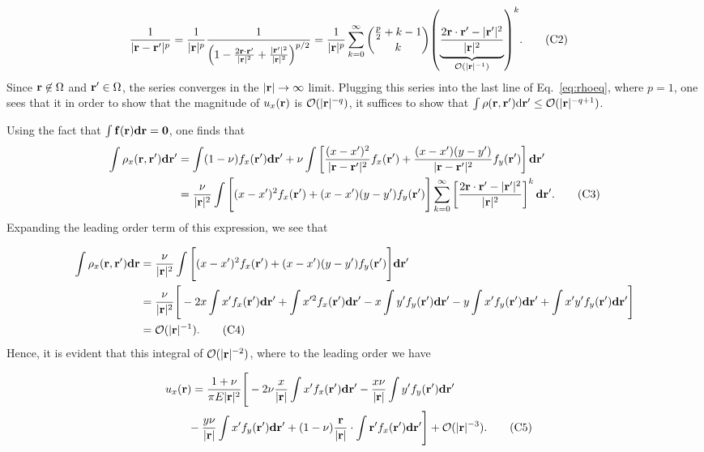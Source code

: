 \documentclass[aps,prl,reprint,groupedaddress,twocolumn]{revtex4-1}
\def\d{{\bf d}}
\def\dd{\mbox{d}}
\def\f{{\bf f}}
\def\r{{\bf r}}
\begin{document}
\begin{appendix}
\begin{align}
\frac{1}{|\r-\r'|^p} &= \frac{1}{|\r|^p}\frac{1}{\left(1 - \frac{2\r\cdot\r'}{|\r|^2} 
+\frac{\vert\r'\vert^{2}}{\vert\r\vert^{2}}\right)^{p/2}} = 
\frac{1}{|\r|^p}\sum_{k=0}^\infty {{{p\over 2}+k-1}\choose{k}} 
{\left( \underbrace{ \frac{2\r\cdot\r' - |\r'|^2}{|\r|^2}}_{\mathcal{O}(|\r|^{-1})} \right)}^k.
\tag{C2}
\end{align}
% 
Since $\r\not\in\Omega$ and $\r'\in\Omega$, the series converges in
the $\vert \r\vert \to \infty$ limit. Plugging this series into the
last line of Eq.~\ref{eq:rhoeq}, where $p=1$, one sees that it in order to show
that the magnitude of $u_x(\r)$ is $\mathcal{O}(|\r|^{-q})$, it
suffices to show that $\int \rho(\r,\r')\dd\r' \leq
{\cal O}(|\r|^{-q+1})$.

Using the fact that $\int \f(\r)\d\r = \mathbf{0}$, one finds that
%
\begin{align}
\int \rho_{x}(\r,\r')\d\r'  & =  \int (1-\nu)f_x(\r')\d\r'
+\nu\int\left[\frac{(x - x')^2}{|\r-\r'|^2} f_{x}(\r') +
\frac{(x-x')(y-y')}{|\r-\r'|^2} f_y(\r')  \right]\d\r' \nonumber\\
\: &= \frac{\nu}{|\r|^2}\int\Bigg[(x - x')^2f_{x}(\r')
+ (x-x')(y-y')f_y(\r')  \Bigg]
\sum_{k=0}^\infty \left[\frac{2\r\cdot\r' - |\r'|^2}{|\r|^2} \right]^k \d\r'.
\tag{C3}
\end{align}
%
Expanding the leading order term of this expression, we see that

\begin{align*}
\int\rho_{x}(\r,\r')\d\r 
&= \frac{\nu}{|\r|^2}\int\Bigg[(x- x')^2f_{x}(\r')+(x-x')(y-y')f_y(\r')\Bigg]
\d\r' \nonumber\\
\: &= \frac{\nu}{|\r|^2}  \Bigg[  -2x\int x' f_x(\r')\d\r'  + \int x'^2 f_x(\r')\d\r'- x\int y' f_y(\r') \d\r'
- y\int x' f_y(\r')\d\r'
+ \int x'y' f_y(\r') \d\r'\Bigg] \nonumber \\
\: & =\mathcal{O}(|\r|^{-1}).\tag{C4}
\end{align*}
%
Hence, it is evident that this integral  of $\mathcal{O}(|\r|^{-2})$,
where to the leading order we have

\begin{align}
\lefteqn{u_x(\r) = \frac{1+\nu}{\pi E |\r|^2}
\Bigg[ -2\nu\frac{x}{|\r|}\int x' f_x(\r')\d\r'
-\frac{x\nu}{|\r|}\int y' f_y(\r') \d\r'  }\nonumber\\
&\qquad- \frac{y\nu}{|\r|}\int x' f_y(\r')\d\r' 
+ (1-\nu)\frac{\r}{|\r|}\cdot\int \r' f_x(\r') \d\r'\Bigg] + \mathcal{O}(|\r|^{-3}).
\tag{C5}
\end{align}


\end{appendix}
\end{document}
